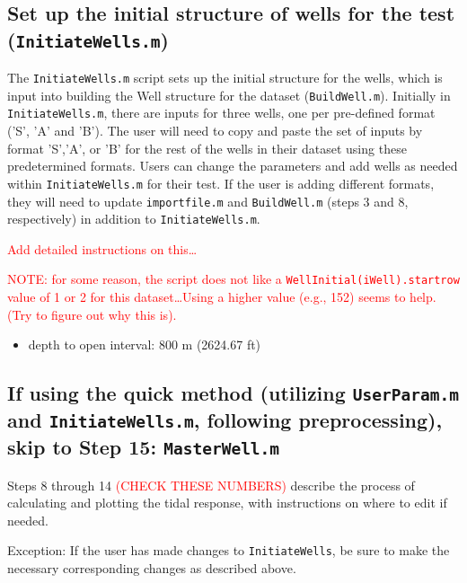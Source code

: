 \documentclass[11pt]{article}
\begin{document}
\subsection{Set up the initial structure of wells for the test (\texttt{InitiateWells.m})}

The \texttt{InitiateWells.m} script sets up the initial structure for the
wells, which is input into building the Well structure for the dataset
(\texttt{BuildWell.m}). Initially in \texttt{InitiateWells.m}, there are inputs
for three wells, one per pre-defined format ('S', 'A' and 'B'). The user will
need to copy and paste the set of inputs by format 'S','A', or 'B' for the rest
of the wells in their dataset using these predetermined formats. Users can
change the parameters and add wells as needed within \texttt{InitiateWells.m}
for their test. If the user is adding different formats, they will need to
update \texttt{importfile.m} and \texttt{BuildWell.m} (steps 3 and 8,
respectively) in addition to \texttt{InitiateWells.m}.

\textcolor{red}{Add detailed instructions on this\dots}

\textcolor{red}{NOTE: for some reason, the script does not like a
\texttt{WellInitial(iWell).startrow} value of 1 or 2 for this
dataset\dots Using a higher value (e.g., 152) seems to help. (Try to
figure out why this is).}

\begin{itemize}
    \item depth to open interval: 800 m (2624.67 ft)
\end{itemize}

\subsection{If using the quick method (utilizing \texttt{UserParam.m} and \texttt{InitiateWells.m}, following preprocessing), skip to Step 15: \texttt{MasterWell.m}}

Steps 8 through 14 \textcolor{red}{(CHECK THESE NUMBERS)} describe the process
of calculating and plotting the tidal response, with instructions on where to
edit if needed.

Exception: If the user has made changes to \texttt{InitiateWells}, be sure to make the
necessary corresponding changes as described above.
\end{document}
